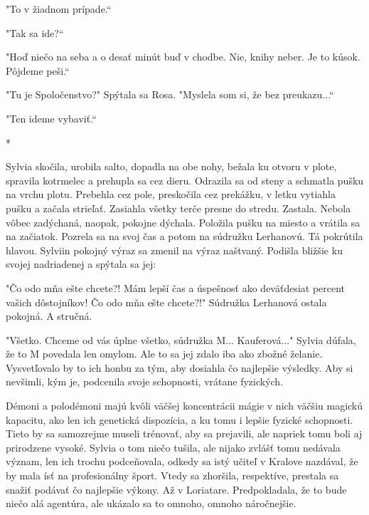 \documentclass{book}
\begin{document}
"$ $To v žiadnom prípade.“

"$ $Tak sa ide?“

"$ $Hoď niečo na seba a o desať minút buď v chodbe. Nie, knihy neber. Je to kúsok. Pôjdeme peši.“

"$ $Tu je Spoločenstvo?"$ $ Spýtala sa Rosa. "$ $Myslela som si, že bez preukazu...“

"$ $Ten ideme vybaviť.“

\begin{center}

*

\end{center}

Sylvia skočila, urobila salto, dopadla na obe nohy, bežala ku otvoru v plote, spravila kotrmelec a prehupla sa cez dieru. Odrazila sa od steny a schmatla pušku na vrchu plotu. Prebehla cez pole, preskočila cez prekážku, v letku vytiahla pušku a začala strieľať. Zasiahla všetky terče presne do stredu. Zastala. Nebola vôbec zadýchaná, naopak, pokojne dýchala. Položila pušku na miesto a vrátila sa na začiatok. Pozrela sa na svoj čas a potom na súdružku Lerhanovú. Tá pokrútila hlavou. Sylviin pokojný výraz sa zmenil na výraz naštvaný. Podišla bližšie ku svojej nadriadenej a spýtala sa jej:

"$ $Čo odo mňa ešte chcete?! Mám lepší čas a úspešnosť ako deväťdesiat percent vašich dôstojníkov! Čo odo mňa ešte chcete?!"$ $ Súdružka Lerhanová ostala pokojná. A stručná.

"$ $Všetko. Chceme od vás úplne všetko, súdružka M... Kauferová..."$ $ Sylvia dúfala, že to M povedala len omylom. Ale to sa jej zdalo iba ako zbožné želanie. Vysvetľovalo by to ich honbu za tým, aby dosiahla čo najlepšie výsledky. Aby si nevšimli, kým je, podcenila svoje schopnosti, vrátane fyzických.

Démoni a polodémoni majú kvôli väčšej koncentrácii mágie v nich väčšiu magickú kapacitu, ako len ich genetická dispozícia, a ku tomu i lepšie fyzické schopnosti. Tieto by sa samozrejme museli trénovať, aby sa prejavili, ale napriek tomu boli aj prirodzene vysoké. Sylvia o tom niečo tušila, ale nijako zvlášť tomu nedávala význam, len ich trochu podceňovala, odkedy sa istý učiteľ v Kralove nazdával, že by mala ísť na profesionálny šport. Vtedy sa zhoršila, respektíve, prestala sa snažiť podávať čo najlepšie výkony. Až v Loriatare. Predpokladala, že to bude niečo alá agentúra, ale ukázalo sa to omnoho, omnoho náročnejšie.
\end{document}
